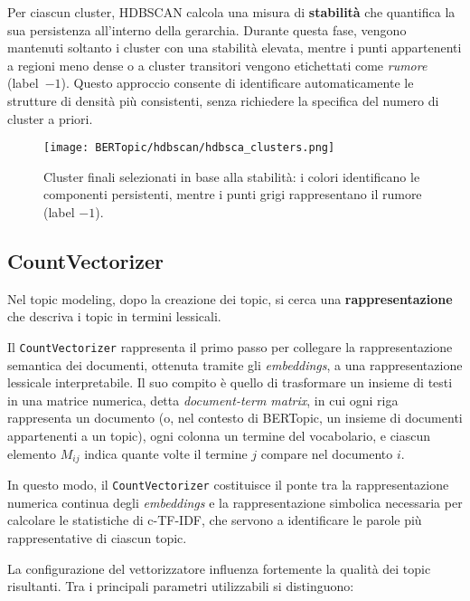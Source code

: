Per ciascun cluster, HDBSCAN calcola una misura di \textbf{stabilità} che quantifica la sua persistenza all'interno della gerarchia. 
Durante questa fase, vengono mantenuti soltanto i cluster con una stabilità elevata, mentre i punti appartenenti a regioni meno dense o a cluster transitori vengono etichettati come \textit{rumore} (label~$-1$). 
Questo approccio consente di identificare automaticamente le strutture di densità più consistenti, senza richiedere la specifica del numero di cluster a priori.

\begin{figure}[H]
\centering
\texttt{[image: BERTopic/hdbscan/hdbsca\_clusters.png]}
\caption{Cluster finali selezionati in base alla stabilità: i colori identificano le componenti persistenti, mentre i punti grigi rappresentano il rumore (label $-1$).}
\label{fig:hdbscan-final-clusters}
\end{figure}

\subsection{CountVectorizer}
Nel topic modeling, dopo la creazione dei topic, si cerca una \textbf{rappresentazione} che descriva i topic in termini lessicali.

Il \texttt{CountVectorizer} rappresenta il primo passo per collegare la rappresentazione semantica dei documenti, ottenuta tramite gli \textit{embeddings}, a una rappresentazione lessicale interpretabile. 
Il suo compito è quello di trasformare un insieme di testi in una matrice numerica, detta \textit{document-term matrix}, in cui ogni riga rappresenta un documento (o, nel contesto di BERTopic, un insieme di documenti appartenenti a un topic), ogni colonna un termine del vocabolario, e ciascun elemento \( M_{ij} \) indica quante volte il termine \( j \) compare nel documento \( i \).

In questo modo, il \texttt{CountVectorizer} costituisce il ponte tra la rappresentazione numerica continua degli \textit{embeddings} e la rappresentazione simbolica necessaria per calcolare le statistiche di c-TF-IDF, che servono a identificare le parole più rappresentative di ciascun topic.

La configurazione del vettorizzatore influenza fortemente la qualità dei topic risultanti. 
Tra i principali parametri utilizzabili si distinguono:

